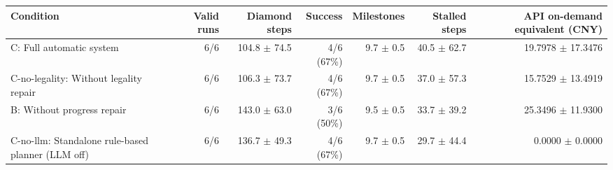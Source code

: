 \begin{tabular}{lrrrrrr}
\hline
Condition & Valid runs & Diamond steps & Success & Milestones & Stalled steps & API on-demand equivalent (CNY) \\
\hline
C: Full automatic system & 6/6 & 104.8 \(\pm\) 74.5 & 4/6 (67\%) & 9.7 \(\pm\) 0.5 & 40.5 \(\pm\) 62.7 & 19.7978 \(\pm\) 17.3476 \\
C-no-legality: Without legality repair & 6/6 & 106.3 \(\pm\) 73.7 & 4/6 (67\%) & 9.7 \(\pm\) 0.5 & 37.0 \(\pm\) 57.3 & 15.7529 \(\pm\) 13.4919 \\
B: Without progress repair & 6/6 & 143.0 \(\pm\) 63.0 & 3/6 (50\%) & 9.5 \(\pm\) 0.5 & 33.7 \(\pm\) 39.2 & 25.3496 \(\pm\) 11.9300 \\
C-no-llm: Standalone rule-based planner (LLM off) & 6/6 & 136.7 \(\pm\) 49.3 & 4/6 (67\%) & 9.7 \(\pm\) 0.5 & 29.7 \(\pm\) 44.4 & 0.0000 \(\pm\) 0.0000 \\
\hline
\end{tabular}
